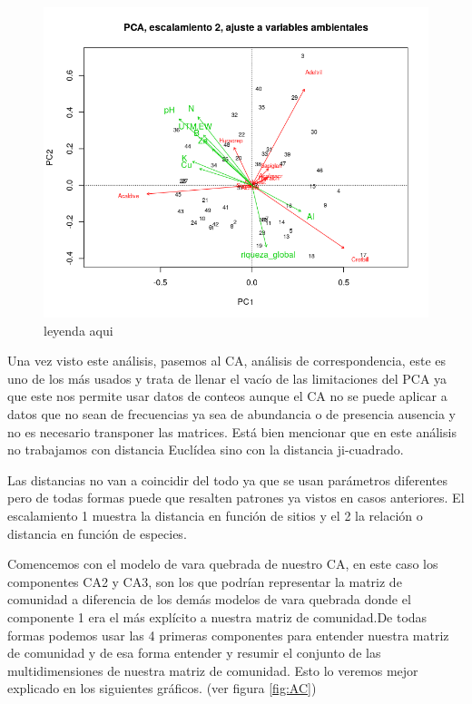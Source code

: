 \documentclass[11pt,]{article}
\begin{document}
\begin{figure}
\centering
\includegraphics{variables_numericas.png}
\caption{\label{fig:variables_numericas}leyenda aqui}
\end{figure}

Una vez visto este análisis, pasemos al CA, análisis de correspondencia,
este es uno de los más usados y trata de llenar el vacío de las
limitaciones del PCA ya que este nos permite usar datos de conteos
aunque el CA no se puede aplicar a datos que no sean de frecuencias ya
sea de abundancia o de presencia ausencia y no es necesario transponer
las matrices. Está bien mencionar que en este análisis no trabajamos con
distancia Euclídea sino con la distancia ji-cuadrado.

Las distancias no van a coincidir del todo ya que se usan parámetros
diferentes pero de todas formas puede que resalten patrones ya vistos en
casos anteriores. El escalamiento 1 muestra la distancia en función de
sitios y el 2 la relación o distancia en función de especies.

Comencemos con el modelo de vara quebrada de nuestro CA, en este caso
los componentes CA2 y CA3, son los que podrían representar la matriz de
comunidad a diferencia de los demás modelos de vara quebrada donde el
componente 1 era el más explícito a nuestra matriz de comunidad.De todas
formas podemos usar las 4 primeras componentes para entender nuestra
matriz de comunidad y de esa forma entender y resumir el conjunto de las
multidimensiones de nuestra matriz de comunidad. Esto lo veremos mejor
explicado en los siguientes gráficos. (ver figura \ref{fig:AC})
\end{document}
